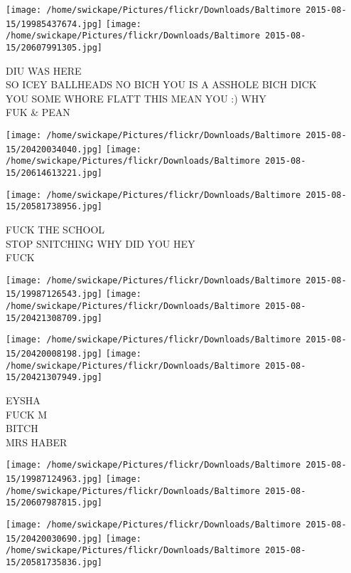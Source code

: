 \documentclass[10pt,letterpaper]{article}
\begin{document}
\texttt{[image: /home/swickape/Pictures/flickr/Downloads/Baltimore 2015-08-15/19985437674.jpg]}
\texttt{[image: /home/swickape/Pictures/flickr/Downloads/Baltimore 2015-08-15/20607991305.jpg]}

DIU WAS HERE\\
SO ICEY BALLHEADS NO BICH YOU IS A ASSHOLE BICH DICK\\
YOU SOME WHORE FLATT THIS MEAN YOU :) WHY\\
FUK \& PEAN\\
\pagebreak

\texttt{[image: /home/swickape/Pictures/flickr/Downloads/Baltimore 2015-08-15/20420034040.jpg]}
\texttt{[image: /home/swickape/Pictures/flickr/Downloads/Baltimore 2015-08-15/20614613221.jpg]}

\vspace{0.25in}
\texttt{[image: /home/swickape/Pictures/flickr/Downloads/Baltimore 2015-08-15/20581738956.jpg]}

FUCK THE SCHOOL\\
STOP SNITCHING WHY DID YOU HEY\\
FUCK\\
\pagebreak

\texttt{[image: /home/swickape/Pictures/flickr/Downloads/Baltimore 2015-08-15/19987126543.jpg]}
\texttt{[image: /home/swickape/Pictures/flickr/Downloads/Baltimore 2015-08-15/20421308709.jpg]}

\texttt{[image: /home/swickape/Pictures/flickr/Downloads/Baltimore 2015-08-15/20420008198.jpg]}
\texttt{[image: /home/swickape/Pictures/flickr/Downloads/Baltimore 2015-08-15/20421307949.jpg]}

EYSHA\\
FUCK M\\
BITCH\\
MRS HABER\\
\pagebreak

\texttt{[image: /home/swickape/Pictures/flickr/Downloads/Baltimore 2015-08-15/19987124963.jpg]}
\texttt{[image: /home/swickape/Pictures/flickr/Downloads/Baltimore 2015-08-15/20607987815.jpg]}

\texttt{[image: /home/swickape/Pictures/flickr/Downloads/Baltimore 2015-08-15/20420030690.jpg]}
\texttt{[image: /home/swickape/Pictures/flickr/Downloads/Baltimore 2015-08-15/20581735836.jpg]}
\end{document}
